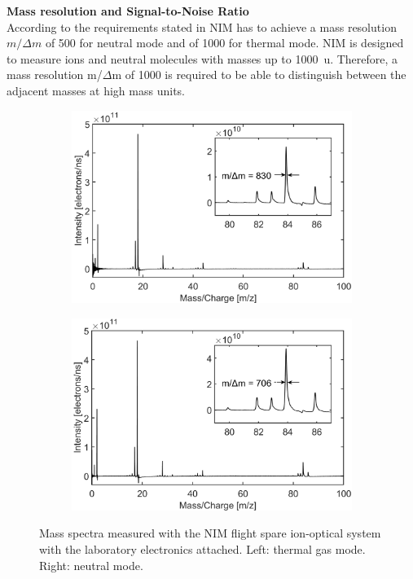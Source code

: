 		\textbf{Mass resolution and Signal-to-Noise Ratio}\\
		According to the requirements stated in \cite{red_book} NIM has to achieve a mass resolution $m/\Delta m$ of 500 for neutral mode and of 1000 for thermal mode. NIM is designed to measure ions and neutral molecules with masses up to 1000~u. Therefore, a mass resolution m/$\Delta$m of 1000 is required to be able to distinguish between the adjacent masses at high mass units.\\
		\begin{figure}[h!]
			\begin{subfigure}{0.5\textwidth}
				\centering
				\includegraphics[width = .95\textwidth]{Experiments/FSLabthMode.png}
			\end{subfigure}
			\begin{subfigure}{0.5\textwidth}
				\centering
				\includegraphics[width = .95\textwidth]{Experiments/FSLabnMode.png}
			\end{subfigure}
			\caption{Mass spectra measured with the NIM flight spare ion-optical system with the laboratory electronics attached. Left: thermal gas mode. Right: neutral mode.}
			\label{fig:ExpFSFlightSenMassRes}
		\end{figure}
